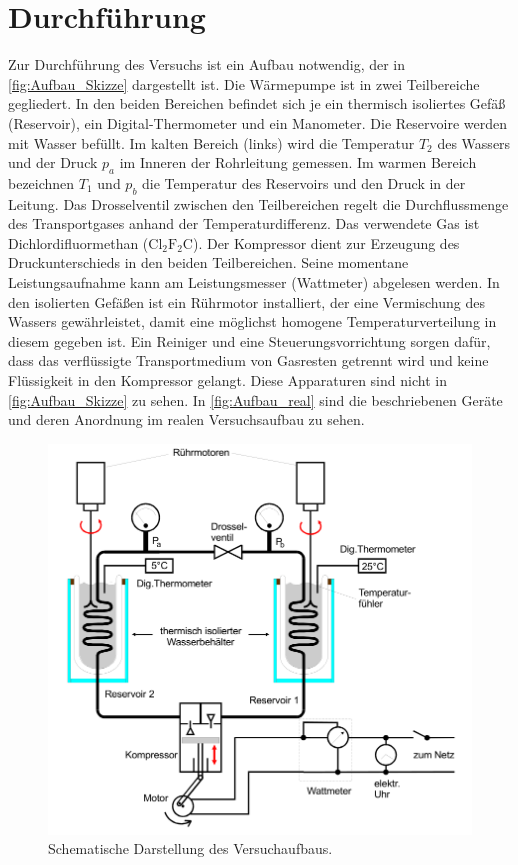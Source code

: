 \section{Durchführung}
\label{sec:Durchführung}
Zur Durchführung des Versuchs ist ein Aufbau notwendig, der in \autoref{fig:Aufbau_Skizze} dargestellt ist.
Die Wärmepumpe ist in zwei Teilbereiche gegliedert. In den beiden Bereichen befindet sich je ein thermisch isoliertes Gefäß (Reservoir), ein Digital-Thermometer und 
ein Manometer. Die Reservoire werden mit Wasser befüllt. Im \dq kalten\dq\: Bereich (links) wird die Temperatur $T_2$ des Wassers und der Druck $p_a$ im Inneren der Rohrleitung 
gemessen. Im \dq warmen\dq\: Bereich bezeichnen $T_1$ und $p_b$ die Temperatur des Reservoirs und den Druck in der Leitung. Das Drosselventil zwischen den Teilbereichen regelt 
die Durchflussmenge des Transportgases anhand der Temperaturdifferenz. Das verwendete Gas ist Dichlordifluormethan ($\text{Cl}_2\text{F}_2\text{C}$). Der Kompressor dient zur Erzeugung des 
Druckunterschieds in den beiden Teilbereichen. Seine momentane Leistungsaufnahme kann am Leistungsmesser (Wattmeter) abgelesen werden. In den isolierten Gefäßen ist ein Rührmotor 
installiert, der eine Vermischung des Wassers gewährleistet, damit eine möglichst homogene Temperaturverteilung in diesem gegeben ist. Ein \dq Reiniger\dq \: und eine 
Steuerungsvorrichtung sorgen dafür, dass das verflüssigte Transportmedium von Gasresten getrennt wird und keine Flüssigkeit in den Kompressor gelangt. Diese Apparaturen sind 
nicht in \autoref{fig:Aufbau_Skizze} zu sehen. In \autoref{fig:Aufbau_real} sind die beschriebenen Geräte und deren Anordnung im realen Versuchsaufbau zu sehen.

\begin{figure}
    \centering
    \caption{Schematische Darstellung des Versuchaufbaus. \cite{v206}}
    \label{fig:Aufbau_Skizze}
    \includegraphics[width=.5\textwidth]{content/Aufbau_Skizze.png}
\end{figure}

